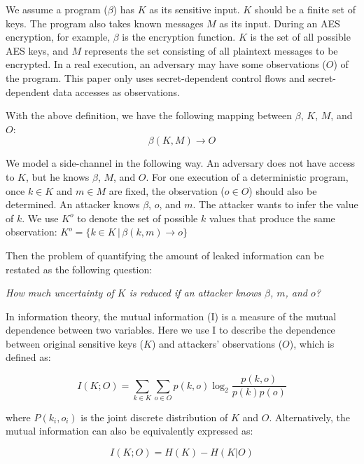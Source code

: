 We assume a program ($\beta$) has $K$ as its sensitive input. $K$ should be
a finite set of keys. The program also takes known messages $M$ as its input.
During an AES encryption, for example,
$\beta$ is the encryption function. $K$ is the set of all possible AES keys,
and $M$ represents the set consisting of all plaintext messages to be encrypted. In a real execution, an adversary may have
some observations ($O$) of the program. This paper only
uses secret-dependent control flows and secret-dependent data
accesses as observations.

With the above definition, we have the following mapping between $\beta$,
$K$, $M$, and $O$:
\begin{displaymath}
    \beta(K, M) \rightarrow O
\end{displaymath}


We model a side-channel in the following way. An adversary does not have
access to $K$, but he knows $\beta$, $M$, and $O$. For one execution of a
deterministic program, once $k \in K$ and $m \in M$ are fixed, the observation
($o \in O$) should also be determined. An attacker knows $\beta$, $o$,
and $m$. The attacker wants to infer the value of $k$. We use $K^o$ to denote
the set of possible $k$ values that produce the same observation: $K^o = \{ k \in K \, |\, \beta(k, m) \rightarrow o\}$

Then the problem of quantifying the amount of leaked information can be
restated as the following question:

\emph{How much uncertainty of $K$ is reduced if an attacker knows $\beta$, $m$, and $o$?}

In information theory, the mutual information (I) is a measure of the mutual
dependence between two variables. Here we use I to describe the
dependence between original sensitive keys ($K$) and attackers' observations ($O$),
which is defined as:

\begin{equation} \label{eq:1}
    I(K;O) = \sum_{k {\in} K}{\sum_{o {\in} O}{p(k, o)\log_2\frac{p(k, o)}{p(k)p(o)}}}
\end{equation}

where $P(k_i, o_i)$ is the joint discrete distribution of $K$ and $O$.
Alternatively, the mutual information can also be equivalently expressed as:

\begin{equation} \label{eq:2}
    I(K;O) = H(K) - H(K|O)
\end{equation}

